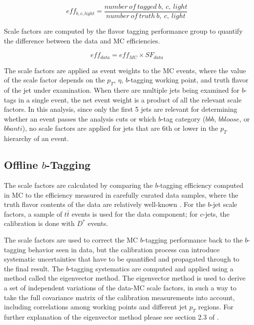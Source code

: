     \begin{equation}
        eff_{b,c,light}=\frac{number\ of\ tagged\ b,\ c,\ light}{number\ of\ truth\ b,\ c,\ light}
    \end{equation}

Scale factors are computed by the flavor tagging performance group to quantify the
difference between the data and MC efficiencies.

    \begin{equation}
        eff_{data}=eff_{MC}\times SF_{data}
    \end{equation}


The scale factors are applied as event weights to the MC events, where the value
of the scale factor depends on the $p_T$, $\eta$, $b$-tagging working point, 
and truth flavor of the jet under examination.  
When there are multiple jets being examined for $b$-tags in a single
event, the net event weight is a product of all the relevant scale factors.
In this analysis, since only the first 5 jets are relevant for determining 
whether an event passes the analysis cuts or which $b$-tag category ($bbb$, 
$bbloose$, or $bbanti$), no scale factors are applied for jets that are 6th
or lower in the $p_T$ hierarchy of an event.

\subsection{Offline $b$-Tagging}
The scale factors are calculated by comparing the $b$-tagging efficiency computed 
in MC to the efficiency measured in carefully curated data samples, where the truth
flavor contents of the data are relatively well-known \cite{b-tagging}.  For the $b$-jet
scale factors, a sample of $t\bar{t}$ events is used for the data component; for 
$c$-jets, the calibration is done with $D^*$ events.

The scale factors are used to correct the MC $b$-tagging performance back to the $b$-tagging
behavior seen in data, but the calibration process can introduce systematic uncertainties
that have to be quantified and propagated through to the final result.  The $b$-tagging
systematics are computed and applied using a method called the eigenvector method.
The eigenvector method is used to derive a set of independent variations of the data-MC scale
factors, in such a way to take the full covariance matrix of the calibration measurements
into account, including correlations among working points and different jet $p_{T}$ regions.
For further explanation of the eigenvector method please see section 2.3 of \cite{VHBTagging}. 


